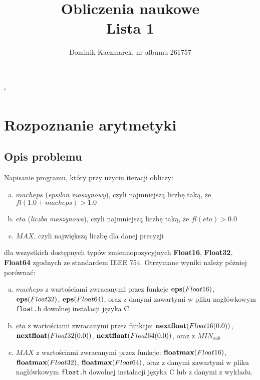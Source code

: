 \documentclass[a4paper]{article}
\title{Obliczenia naukowe\\Lista 1}
\author{Dominik Kaczmarek, nr albumu 261757}
\begin{document}
`
\maketitle
\tableofcontents

\section{Rozpoznanie arytmetyki}
    \subsection{Opis problemu}
        Napisanie programu, który przy użyciu iteracji obliczy:
        \begin{enumerate}[a)]
        \item \(macheps\) (\emph{epsilon maszynowy}), czyli najmniejszą liczbę taką, że \(fl(1.0 + macheps) > 1.0\) 
        \item \(eta\) (\emph{liczba maszynowa}), czyli najmniejszą liczbę taką, że \(fl(eta) > 0.0\)
        \item \(MAX\), czyli największą liczbę dla danej precyzji 
        \end{enumerate}
        dla wszystkich dostępnych typów zmiennopozycyjnych \textbf{Float16}, \textbf{Float32}, \textbf{Float64} zgodnych ze standardem IEEE 754.
        Otrzymane wyniki należy póżniej porównać:
        \begin{enumerate}[a)]
        \item \(macheps\) z wartościami zwracanymi przez funkcje \(\bold{eps}(Float16)\), \(\bold{eps}(Float32)\), \(\bold{eps}(Float64)\), oraz z danymi zawartymi w pliku nagłówkowym \texttt{float.h} dowolnej instalacji języka C.
        \item \(eta\) z wartościami zwracanymi przez funkcje: \(\bold{nextfloat}(Float16(0.0))\), \(\bold{nextfloat}(Float32(0.0))\), \(\bold{nextfloat}(Float64(0.0))\), oraz z $MIN_{sub}$
        \item \(MAX\) z wartościami zwracanymi przez funkcje: \(\bold{floatmax}(Float16)\), \(\bold{floatmax}(Float32)\), \(\bold{floatmax}(Float64)\), oraz z danymi zawartymi w pliku nagłówkowym \texttt{float.h} dowolnej instalacji języka C lub z danymi z wykładu.
        \end{enumerate}
\end{document}

